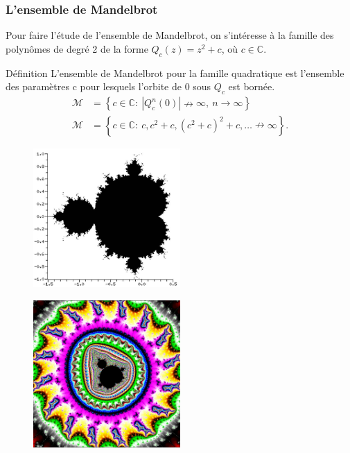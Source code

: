 \documentclass[aspectratio=1610]{beamer}
\begin{document}
\begin{frame}
\frametitle{L'ensemble de Mandelbrot}

Pour faire l'étude de l'ensemble de Mandelbrot, on s'intéresse à la famille des polynômes de degré 2 de la forme $Q_{c}(z)=z^2+c$, où $c\in \mathbb{C}$.

\begin{block}{Définition}
    L'ensemble de Mandelbrot pour la famille quadratique est l'ensemble des paramètres c pour lesquels l'orbite de 0 sous $Q_{c}$ est bornée.
\[
\begin{align*}
    \mathcal{M} &=\left\{ c \in \mathbb{C}: \ |Q^{n}_c(0)| \nrightarrow \infty, \ n \to \infty \right\}\\
\mathcal{M} &= \left\{ c \in \mathbb{C}:  \ c,c^2+c,(c^2+c)^2+c, \ldots \nrightarrow \infty \right\}
.\end{align*}
\]
\end{block}
\begin{minipage}{0.5\textwidth}
\begin{figure}[h]
    \centering
    \includegraphics[width=0.5\textwidth]{fractal_2}
    \label{fig:Pou de Mandelbrot}
\end{figure} 
\end{minipage}%
\begin{minipage}{0.5\textwidth}
    \begin{figure}[h]
        \centering
        \includegraphics[width=0.5\textwidth]{mandel}
        \label{fig:pou de Mandelbrot colorié}
    \end{figure}
\end{minipage}
\end{frame}
\end{document}
